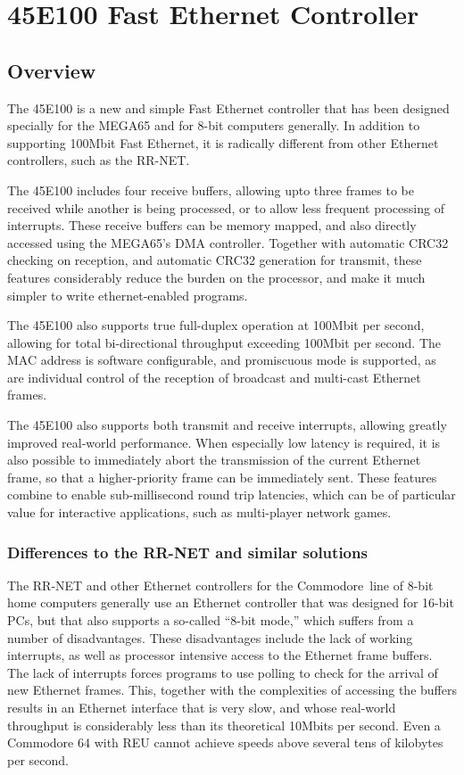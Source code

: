 \chapter{45E100 Fast Ethernet Controller}

\section{Overview}

The 45E100 is a new and simple Fast Ethernet controller that has been
designed specially for the MEGA65 and for 8-bit computers generally.
In addition to supporting 100Mbit Fast Ethernet, it is radically
different from other Ethernet controllers, such as the RR-NET.

The 45E100 includes four receive buffers, allowing upto three frames to be
received while another is being processed, or to allow less frequent processing of interrupts.
These receive buffers can be memory mapped, and also directly accessed using the MEGA65's DMA controller.
Together with automatic CRC32 checking on reception, and automatic CRC32 generation for transmit, these features considerably
reduce the burden on the processor, and make it much simpler to write ethernet-enabled programs.

The 45E100 also supports true
full-duplex operation at 100Mbit per second, allowing for total bi-directional
throughput exceeding 100Mbit per second.  The MAC address is software
configurable, and promiscuous mode is supported, as are individual control
of the reception of broadcast and multi-cast Ethernet frames.

The 45E100 also
supports both transmit and receive interrupts, allowing greatly improved
real-world performance. When especially low latency is required, it is also possible
to immediately abort the transmission of the current Ethernet frame, so that a
higher-priority frame can be immediately sent.
These features combine to enable sub-millisecond round trip latencies,
which can be of particular value for interactive applications, such as multi-player network
games.

\subsection{Differences to the RR-NET and similar solutions}

The RR-NET and other Ethernet controllers for the Commodore\texttrademark \ line
of 8-bit home computers generally use an Ethernet controller that was
designed for 16-bit PCs, but that also supports a so-called ``8-bit mode,''
which suffers from a number of disadvantages. These disadvantages
include the lack of working interrupts, as well as processor intensive access to
the Ethernet frame buffers.  The lack of interrupts forces programs to
use polling to check for the arrival of new Ethernet frames.  This,
together with the complexities of accessing the buffers results in an
Ethernet interface that is very slow, and whose real-world throughput
is considerably less than its theoretical 10Mbits per second.  Even
a Commodore 64 with REU cannot achieve speeds above several tens of
kilobytes per second.

